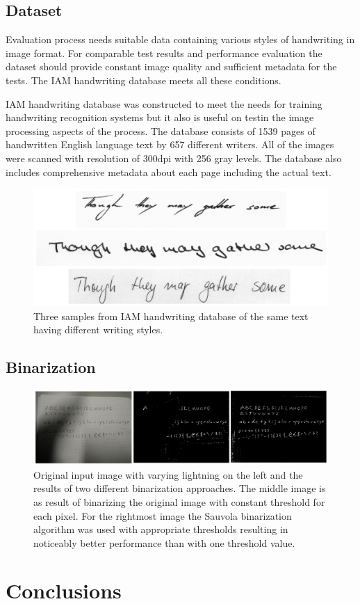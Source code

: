 \documentclass{article}
\begin{document}
  \subsection{Dataset}
    Evaluation process needs suitable data containing various styles of handwriting in image format. For comparable test results and performance evaluation the dataset should provide constant image quality and sufficient metadata for the tests. The IAM handwriting database meets all these conditions.

    IAM handwriting database was constructed to meet the needs for training handwriting recognition systems but it also is useful on testin the image processing aspects of the process. The database consists of 1539 pages of handwritten English language text by 657 different writers. All of the images were scanned with resolution of 300dpi with 256 gray levels. The database also includes comprehensive metadata about each page including the actual text. \cite{IAM}

    \begin{figure}
      \centering
      \includegraphics[natwidth=1530,natheight=660,scale=0.3]{iamsample.png}
      \caption{Three samples from IAM handwriting database of the same text having different writing styles. \label{fig:iamsample} }
    \end{figure}

  \subsection{Binarization}

    \begin{figure}
      \centering
      \includegraphics[natwidth=2140,natheight=546,scale=0.24]{binarization.png}
      \caption{Original input image with varying lightning on the left and the results of two different binarization approaches. The middle image is as result of binarizing the original image with constant threshold for each pixel. For the rightmost image the Sauvola binarization algorithm was used with appropriate thresholds resulting in noticeably better performance than with one threshold value. \label{fig:binarization} }
    \end{figure}




  \newpage
  \section{Conclusions}

  \newpage
  
  
\end{document}
